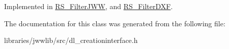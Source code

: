 Implemented in \hyperlink{classRS__FilterJWW_aeacb6893b7aeb7b9e9e9f353b7945c3e}{R\-S\-\_\-\-Filter\-J\-W\-W}, and \hyperlink{classRS__FilterDXF_aa15ef5accc8540ab6f3bb77332e1a36b}{R\-S\-\_\-\-Filter\-D\-X\-F}.



The documentation for this class was generated from the following file\-:\begin{DoxyCompactItemize}
\item 
libraries/jwwlib/src/dl\-\_\-creationinterface.\-h\end{DoxyCompactItemize}
